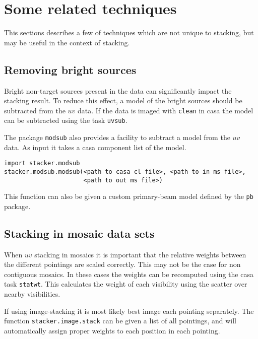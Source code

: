 \documentclass{article}
\begin{document}
\section{Some related techniques}
This sections describes a few of techniques
which are not unique to stacking, 
but may be useful in the context of stacking.

\subsection{Removing bright sources}
Bright non-target sources present in the data can significantly impact the stacking result.
To reduce this effect, a model of the bright sources should be subtracted from the $uv$ data.
If the data is imaged with {\tt clean} in casa the model can be subtracted using the task {\tt uvsub}.

The package {\tt modsub} also provides a facility to subtract a model from the $uv$ data.
As input it takes a casa component list of the model. 
\begin{verbatim}
import stacker.modsub
stacker.modsub.modsub(<path to casa cl file>, <path to in ms file>,
	                  <path to out ms file>)
\end{verbatim}
This function can also be given a custom primary-beam model defined by the {\tt pb} package.


\subsection{Stacking in mosaic data sets}
When $uv$ stacking in mosaics it is important that the relative weights between the different pointings are scaled correctly.
This may not be the case for non contiguous mosaics.
In these cases the weights can be recomputed using the casa task {\tt statwt}. 
This calculates the weight of each visibility using the scatter over nearby visibilities.

If using image-stacking it is most likely best image each pointing separately.
The function {\tt stacker.image.stack} can be given a list of all pointings,
and will automatically assign proper weights to each position in each pointing.



 
\end{document}
